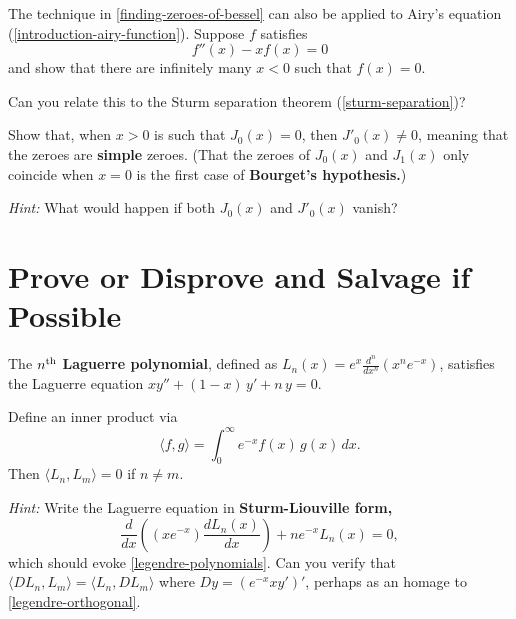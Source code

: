 \documentclass{homework}
\begin{document}
\begin{problem}The technique in \ref{finding-zeroes-of-bessel} can also be applied to Airy's equation (\ref{introduction-airy-function}).  Suppose $f$ satisfies
  \[
    f''(x) - x f(x) = 0
  \]
  and show that there are infinitely many $x < 0$ such that
  $f(x) = 0$.

  Can you relate this to the Sturm separation theorem
  (\ref{sturm-separation})?
\end{problem}

\begin{problem}
  Show that, when $x > 0$ is such that $J_0(x) = 0$, then
  $J'_0(x) \neq 0$, meaning that the zeroes are \textbf{simple}
  zeroes.  (That the zeroes of $J_0(x)$ and $J_1(x)$ only coincide when
  $x=0$ is the first case of \textbf{Bourget's hypothesis.})

  \textit{Hint:} What would happen if both $J_0(x)$ and $J'_0(x)$
  vanish?
\end{problem}

\section{Prove or Disprove and Salvage if Possible}

\begin{problem}
  The $n^{\mbox{\scriptsize th}}$ \textbf{Laguerre polynomial}, defined as
  \(L_n(x) = e^x \displaystyle\frac{d^n}{dx^n} (x^n e^{-x})\),
  satisfies the Laguerre equation \(x y'' + (1-x) \, y' + n \, y = 0\).
\end{problem}

\begin{problem}
  Define an inner product via
  \[
    \langle f, g \rangle = \int_0^\infty e^{-x} f(x) \, g(x) \, dx.
  \]
  Then $\langle L_n, L_m \rangle = 0$ if $n \neq m$.
  
  \textit{Hint:}  Write the Laguerre equation in \textbf{Sturm-Liouville form,}
  \[
    \frac{d}{dx}\left(\left(x e^{-x}\right){\frac {d L_{n}(x)}{dx}}\right)+ n e^{-x} L_{n}(x)=0,
  \]
  which should evoke \ref{legendre-polynomials}.  Can you verify that $\langle D L_n, L_m \rangle = \langle L_n, DL_m \rangle$ where $Dy = (e^{-x} x y')'$, perhaps as an homage to \ref{legendre-orthogonal}.
\end{problem}
\end{document}
